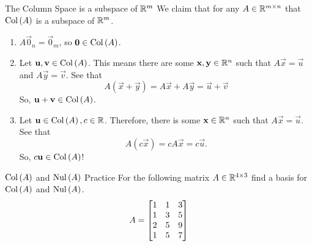 \documentclass[xcoler=dvipsnames, aspectratio=169]{beamer}
\begin{document}
    \begin{frame}{The Column Space is a subspace of $\mathbb{R}^m$}
        We claim that for any $A\in\mathbb{R}^{m\times n}$ that $\mathrm{Col}\left(A\right)$ is a subspace of $\mathbb{R}^m$.
        \begin{enumerate}
            \pause\item $A\vec{0}_n = \vec{0}_m$, so $\mathbf{0}\in\mathrm{Col}\left(A\right)$.
            \pause\item Let $\mathbf{u},\mathbf{v}\in\mathrm{Col}\left(A\right)$. This means there are some $\mathbf{x},\mathbf{y}\in\mathbb{R}^n$
                such that $A\vec{x} = \vec{u}$ and $A\vec{y}=\vec{v}$. See that
                \[
                    A(\vec{x}+\vec{y}) = A\vec{x} + A\vec{y} = \vec{u}+\vec{v}
                \]
                So, $\mathbf{u}+\mathbf{v}\in\mathrm{Col}\left(A\right)$.
            \pause\item Let $\mathbf{u}\in\mathrm{Col}\left(A\right),c\in\mathbb{R}$. Therefore, there is some $\mathbf{x}\in\mathbb{R}^n$ such that
                $A\vec{x} = \vec{u}$. See that
                \[
                    A(c\vec{x}) = cA\vec{x} = c\vec{u}.
                \]
                So, $c\mathbf{u}\in\mathrm{Col}\left(A\right)$!
        \end{enumerate}
    \end{frame}
    \begin{frame}{$\mathrm{Col}\left(A\right)$ and $\mathrm{Nul}\left(A\right)$ Practice}
        For the following matrix $A\in\mathbb{R}^{4\times 3}$ find a basis for $\mathrm{Col}\left(A\right)$ and $\mathrm{Nul}\left(A\right)$.
        \[
            A = \begin{bmatrix}
                1 & 1 & 3\\
                1 & 3 & 5\\
                2 & 5 & 9\\
                1 & 5 & 7
            \end{bmatrix}
        \]
        \iftoggle{showSolutions}{
            \[
                \bMat{
                    1 & 1 & 3\\
                    1 & 3 & 5\\
                    2 & 5 & 9\\
                    1 & 5 & 7
                }\pause\xrightarrow[R_3=R_3-2R_1]{R_2=R_2-R_1}\bMat{
                    1 & 1 & 3\\
                    0 & 2 & 2\\
                    0 & 3 & 3\\
                    1 & 5 & 7
                }\pause\xrightarrow{R_4=R_4-R_1}\bMat{
                    1 & 1 & 3\\
                    0 & 2 & 2\\
                    0 & 3 & 3\\
                    0 & 4 & 4
                }\pause\rightarrow\bMat{
                    1 & 1 & 3\\
                    0 & 1 & 1\\
                    0 & 1 & 1\\
                    0 & 1 & 1
                }\pause\rightarrow\bMat{
                    1 & 0 & 2\\
                    0 & 1 & 1\\
                    0 & 0 & 0\\
                    0 & 0 & 0
                }
            \]
        }{\vspace{130pt}}
    \end{frame}
\end{document}
